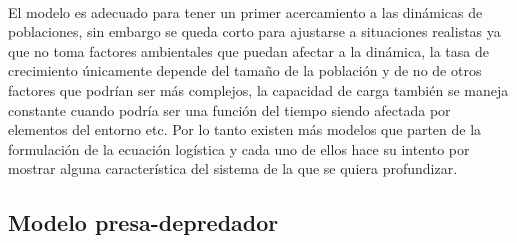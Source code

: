 \\
El modelo es adecuado para tener un primer acercamiento a las dinámicas de poblaciones, sin embargo se queda corto para ajustarse a situaciones realistas ya que no toma factores ambientales que puedan afectar a la dinámica, la tasa de crecimiento únicamente depende del tamaño de la población y de no de otros factores que podrían ser más complejos, la capacidad de carga también se maneja constante cuando podría ser una función del tiempo siendo afectada por elementos del entorno etc. Por lo tanto existen más modelos que parten de la formulación de la ecuación logística y cada uno de ellos hace su intento por mostrar alguna característica del sistema de la que se quiera profundizar.

\subsection{Modelo presa-depredador}

